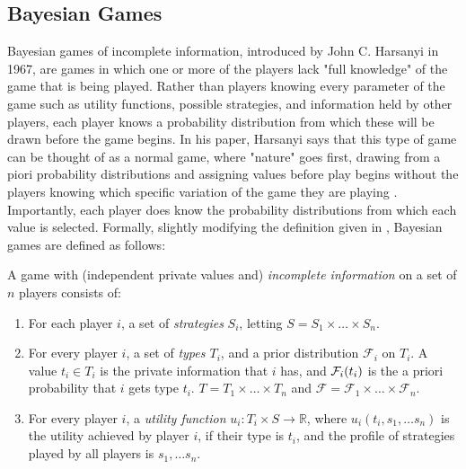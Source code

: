 \documentclass[12pt,twoside]{reedthesis}
\begin{document}
\subsection{Bayesian Games}
Bayesian games of incomplete information, introduced by John C. Harsanyi in 1967, are games in which one or more of the players lack "full knowledge" of the game that is being played. Rather than players knowing every parameter of the game such as utility functions, possible strategies, and information held by other players, each player knows a probability distribution from which these will be drawn before the game begins. In his paper, Harsanyi says that this type of game can be thought of as a normal game, where "nature" goes first, drawing from a piori probability distributions and assigning values before play begins without the players knowing which specific variation of the game they are playing \citep[p.~159]{Harsanyi1967}.
Importantly, each player does know the probability distributions from which each value is selected. Formally, slightly modifying the definition given in \citet{Nisan2007}, Bayesian games are defined as follows:

\begin{dfn}
	A game with (independent private values and) \textit{incomplete information} on a set of $n$ players consists of:
	\begin{enumerate}
		\item For each player $i$, a set of {\em strategies} $S_i$, letting $S = S_1 \times \ldots \times S_n$.
		\item For every player $i$, a set of {\em types $T_i$}, and a prior distribution $\mathcal{F}_i$ on $T_i$. A value $t_i \in T_i$ is the private information that $i$ has, and $\mathcal{F}_i(t_i)$ is the a priori probability that $i$ gets type $t_i$. $T = T_1 \times \ldots \times T_n$ and $\mathcal{F} = \mathcal{F}_1 \times \ldots \times \mathcal{F}_n$.
		\item For every player $i$, a \textit{utility function} $u_i : T_i \times S \rightarrow \mathbb{R}$, where $u_i(t_i, s_1, \ldots s_n)$ is the utility achieved by player $i$, if their type is $t_i$, and the profile of strategies played by all players is $s_1, \ldots s_n$.
	\end{enumerate} 
\label{dfn:BayesianGame}
\end{dfn}
\end{document}
